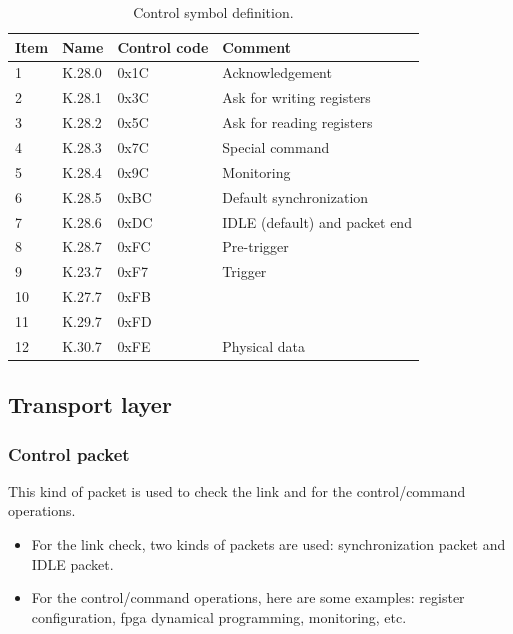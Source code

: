 \begin{table} [!htbp]
\centering
\caption{Control symbol definition.}
\label{chapappA::tab::ControlSymbol}
\begin{tabular}{m{1.5cm} M{2.5cm} M{2.5cm} M{4cm}}
\toprule
{}
\textbf{Item}  			&\textbf{Name}		&\textbf{Control code}	&\textbf{Comment}\\
						&K.28.0				&	0x1C					&	Acknowledgement\\
2						&K.28.1				&	0x3C					&	Ask for writing registers\\
3						&K.28.2				&	0x5C					&	Ask for reading registers\\
4						&K.28.3				&	0x7C					&	Special command\\
5						&K.28.4				&	0x9C					&	Monitoring\\
6						&K.28.5				&	0xBC					& 	Default synchronization\\
7						&K.28.6				&	0xDC					& 	IDLE (default) and packet end\\
8						&K.28.7				&	0xFC					&	Pre-trigger\\
9						&K.23.7				&	0xF7					&	Trigger \\
10						&K.27.7				&	0xFB					&	\\
11						&K.29.7				&	0xFD					&	\\
12						&K.30.7				&	0xFE					&	Physical data\\
\bottomrule
\end{tabular}
\end{table}


\subsection{Transport layer}\label{chapappA::subsec::transpLayer}
\subsubsection{Control packet}\label{chapappA::subsubsec::ctrlPacket}
This kind of packet is used to check the link and for the control/command operations.
\begin{itemize}
\item For the link check, two kinds of packets are used: synchronization packet and IDLE packet.
\item For the control/command operations, here are some examples: register configuration,  \gls{fpga} dynamical programming, monitoring, etc.\newline
\end{itemize}

